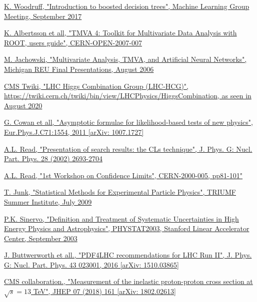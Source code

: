 \documentclass[a4paper, 10pt, openright]{report}
\begin{document}
\begin{thebibliography}{1}
\href{https://indico.fnal.gov/event/15356/contributions/31377/attachments/19671/24560/DecisionTrees.pdf}{K. Woodruff,
"Introduction to boosted decision trees", Machine Learning Group Meeting, September 2017}

\href{https://indico.cern.ch/event/5007/contributions/1177811/attachments/962648/1366777/reu_presentation3.pdf}{K. Albertsson et all,
"TMVA 4: Toolkit for Multivariate Data Analysis with ROOT, users guide", CERN-OPEN-2007-007}

\href{https://root.cern.ch/root/htmldoc/guides/tmva/TMVAUsersGuide.pdf}{M. Jachowski,
"Multivariate Analysis, TMVA, and Artificial Neural Networks", Michigan REU Final Presentations, August 2006}

\href{https://twiki.cern.ch/twiki/bin/view/LHCPhysics/HiggsCombination}{\ac{CMS} Twiki,
"LHC Higgs Combination Group (LHC-HCG)", \url{https://twiki.cern.ch/twiki/bin/view/LHCPhysics/HiggsCombination}, as seen in August 2020}

\href{https://arxiv.org/abs/1007.1727}{G. Cowan et all,
"Asymptotic formulae for likelihood-based tests of new physics", Eur.Phys.J.C71:1554, 2011 [arXiv: 1007.1727]}

\href{https://indico.cern.ch/event/398949/attachments/799330/1095613/The\_CLs\_Technique.pdf}{A.L. Read, "Presentation of search results: the CLs technique", J. Phys. G: Nucl. Part. Phys. 28 (2002) 2693-2704}

\href{https://cds.cern.ch/record/411537/files/CERN-2000-005.pdf}{A.L. Read,
"1st Workshop on Confidence Limits", CERN-2000-005, pp81-101"}

\href{https://www-cdf.fnal.gov/~trj/tsi09/trjtsi_Day1.pdf}{T. Junk,
"Statistical Methods for Experimental Particle Physics", TRIUMF Summer Institute, July 2009}

\href{https://hep.physics.utoronto.ca/~pekka/papers/systematicsreview.pdf}{P.K. Sinervo,
"Definition and Treatment of Systematic Uncertainties in High Energy Physics and Astrophysics", PHYSTAT2003, Stanford Linear Accelerator Center, September 2003}

\href{https://arxiv.org/abs/1510.03865}{J. Buttwerworth et all.,
"PDF4LHC recommendations for LHC Run II", J. Phys. G: Nucl. Part. Phys. 43 023001, 2016 [arXiv: 1510.03865]}

\href{https://arxiv.org/abs/1802.02613}{CMS collaboration.,
"Measurement of the inelastic proton-proton cross section at $\sqrt{s} = 13$ TeV", 	JHEP 07 (2018) 161 [arXiv: 1802.02613]}


\end{thebibliography}
\end{document}
